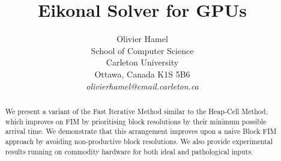 \documentclass[11pt]{article}       %
\begin{document}


\title{Eikonal Solver for GPUs}


\author{
Olivier Hamel\\
School of Computer Science\\
Carleton University\\
Ottawa, Canada K1S 5B6\\
{\em olivierhamel@cmail.carleton.ca}
} %

\maketitle

\begin{abstract}
We present a variant of the Fast Iterative Method\cite{jeong2008fast} similar to the Heap-Cell Method\cite{chacon2012fast}, which improves on FIM by prioritising block resolutions by their minimum possible arrival time. We demonstrate that this arrangement improves upon a naive Block FIM approach by avoiding non-productive block resolutions. We also provide experimental results running on commodity hardware for both ideal and pathological inputs.
\end{abstract}

\end{document}

